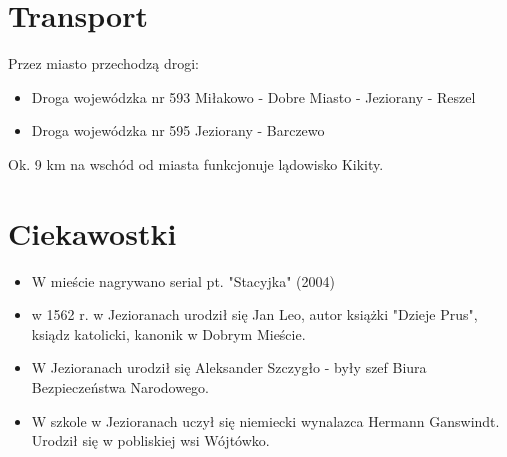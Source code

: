 \documentclass[]{beamer}
\begin{document}
\section{Transport}
\begin{frame}
Przez miasto przechodzą drogi:
\begin{itemize}
\item Droga wojewódzka nr 593 Miłakowo - Dobre Miasto - Jeziorany - Reszel
\pause
\item Droga wojewódzka nr 595 Jeziorany - Barczewo
\end{itemize}
\pause
Ok. 9 km na wschód od miasta funkcjonuje lądowisko Kikity.
\end{frame}

\section{Ciekawostki}
\begin{frame}
\begin{itemize}
\item W mieście nagrywano serial pt. "Stacyjka" (2004)
\pause
\item w 1562 r. w Jezioranach urodził się Jan Leo, autor książki "Dzieje Prus", ksiądz katolicki, kanonik w Dobrym Mieście.
\pause
\item W Jezioranach urodził się Aleksander Szczygło - były szef Biura Bezpieczeństwa Narodowego.
\pause
\item W szkole w Jezioranach uczył się niemiecki wynalazca Hermann Ganswindt. Urodził się w pobliskiej wsi Wójtówko.

\end{itemize}
\end{frame}
\end{document}
